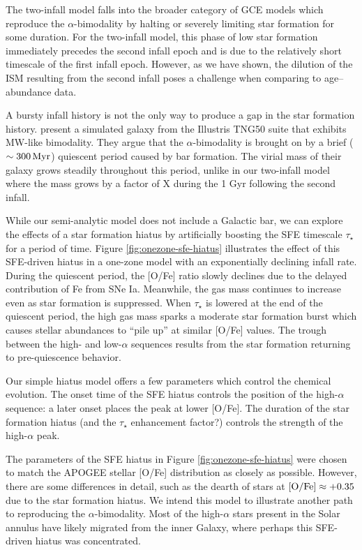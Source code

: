 \documentclass[twocolumn,twocolappendix,linenumbers]{aastex631}
\newcommand{\mathOFe}{{\rm [O/Fe]}}
\newcommand{\todo}[1]{{\color{red}#1}}
\begin{document}
The two-infall model falls into the broader category of GCE models which reproduce the $\alpha$-bimodality by halting or severely limiting star formation for some duration. For the two-infall model, this phase of low star formation immediately precedes the second infall epoch and is due to the relatively short timescale of the first infall epoch. However, as we have shown, the dilution of the ISM resulting from the second infall poses a challenge when comparing to age--abundance data.

A bursty infall history is not the only way to produce a gap in the star formation history. \citet{beane_rising_2024} present a simulated galaxy from the Illustris TNG50 suite that exhibits MW-like bimodality. They argue that the $\alpha$-bimodality is brought on by a brief ($\sim300\,{\rm Myr}$) quiescent period caused by bar formation. The virial mass of their galaxy grows steadily throughout this period, unlike in our two-infall model where the mass grows by a factor of \todo{X} during the 1 Gyr following the second infall.

While our semi-analytic model does not include a Galactic bar, we can explore the effects of a star formation hiatus by artificially boosting the SFE timescale $\tau_\star$ for a period of time. Figure \ref{fig:onezone-sfe-hiatus} illustrates the effect of this SFE-driven hiatus in a one-zone model with an exponentially declining infall rate. During the quiescent period, the [O/Fe] ratio slowly declines due to the delayed contribution of Fe from SNe Ia. Meanwhile, the gas mass continues to increase even as star formation is suppressed. When $\tau_\star$ is lowered at the end of the quiescent period, the high gas mass sparks a moderate star formation burst which causes stellar abundances to ``pile up'' at similar [O/Fe] values. The trough between the high- and low-$\alpha$ sequences results from the star formation returning to pre-quiescence behavior.

Our simple hiatus model offers a few parameters which control the chemical evolution. The onset time of the SFE hiatus controls the position of the high-$\alpha$ sequence: a later onset places the peak at lower [O/Fe]. The duration of the star formation hiatus \todo{(and the $\tau_\star$ enhancement factor?)} controls the strength of the high-$\alpha$ peak.

The parameters of the SFE hiatus in Figure \ref{fig:onezone-sfe-hiatus} were chosen to match the APOGEE stellar [O/Fe] distribution as closely as possible. However, there are some differences in detail, such as the dearth of stars at $\mathOFe\approx+0.35$ due to the star formation hiatus. We intend this model to illustrate another path to reproducing the $\alpha$-bimodality. Most of the high-$\alpha$ stars present in the Solar annulus have likely migrated from the inner Galaxy, where perhaps this SFE-driven hiatus was concentrated.
\end{document}
